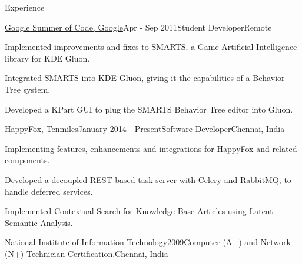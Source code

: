 \documentclass{gradresume} %
\begin{document}
\begin{rSection}{Experience}

    \begin{rSubsection}{\href{https://www.google-melange.com/gsoc/project/details/google/gsoc2011/pranavrc/5757334940811264}{Google Summer of Code, Google}}{Apr - Sep 2011}{Student Developer}{Remote}
\item Implemented improvements and fixes to SMARTS, a Game Artificial Intelligence library for KDE Gluon.
\item Integrated SMARTS into KDE Gluon, giving it the capabilities of a Behavior Tree system.
\item Developed a KPart GUI to plug the SMARTS Behavior Tree editor into Gluon.
\end{rSubsection}


\begin{rSubsection}{\href{https://happyfox.com/}{HappyFox, Tenmiles}}{January 2014 - Present}{Software Developer}{Chennai, India}
\item Implementing features, enhancements and integrations for HappyFox and related components.
\item Developed a decoupled REST-based task-server with Celery and RabbitMQ, to handle deferred services.
\item Implemented Contextual Search for Knowledge Base Articles using Latent Semantic Analysis.
\end{rSubsection}


\begin{rSubsection}{National Institute of Information Technology}{2009}{Computer (A+) and Network (N+) Technician Certification.}{Chennai, India}
\end{rSubsection}

\end{rSection}

\end{document}
